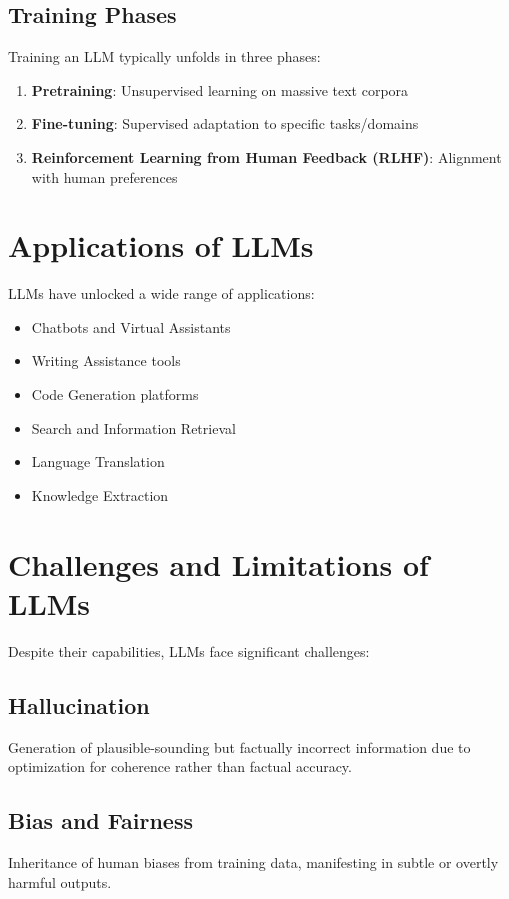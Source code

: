 \documentclass[openany]{book}
\begin{document}
\subsection{Training Phases}
Training an LLM typically unfolds in three phases:

\begin{enumerate}
    \item \textbf{Pretraining}: Unsupervised learning on massive text corpora
    \item \textbf{Fine-tuning}: Supervised adaptation to specific tasks/domains
    \item \textbf{Reinforcement Learning from Human Feedback (RLHF)}: Alignment
     with human preferences
\end{enumerate}

\section{Applications of LLMs}

LLMs have unlocked a wide range of applications:

\begin{itemize}
    \item Chatbots and Virtual Assistants
    \item Writing Assistance tools
    \item Code Generation platforms
    \item Search and Information Retrieval
    \item Language Translation
    \item Knowledge Extraction
\end{itemize}

\section{Challenges and Limitations of LLMs}

Despite their capabilities, LLMs face significant challenges:

\subsection{Hallucination}
Generation of plausible-sounding but factually incorrect information due to 
optimization for coherence rather than factual accuracy.

\subsection{Bias and Fairness}
Inheritance of human biases from training data, manifesting in subtle or 
overtly harmful outputs.
\end{document}
